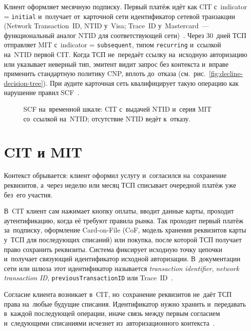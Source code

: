 Клиент оформляет месячную подписку. Первый платёж идёт как CIT с~indicator =
\texttt{initial} и~получает от~карточной сети идентификатор сетевой транзакции
(Network Transaction~ID, NTID у~Visa; Trace~ID у~Mastercard~--- функциональный
аналог NTID для соответствующей сети)~\cite{mrc-nti-trace-id}. Через 30~дней
ТСП отправляет MIT с~indicator = \texttt{subsequent}, типом \texttt{recurring}
и~ссылкой на~NTID первой CIT. Когда ТСП не~передаёт ссылку на~исходную
авторизацию или указывает неверный тип, эмитент видит запрос без контекста
и~вправе применить стандартную политику CNP, вплоть до~отказа
(см.~рис.~\ref{fig:decline-decision-tree}). При аудите карточная сеть
квалифицирует такую операцию как нарушение правил
SCF~\cite{mc-tpr,visa-core-rules}.

\begin{figure}[htbp]
  \centering
  \caption{SCF на~временной шкале: CIT с~выдачей NTID и~серия MIT
  со~ссылкой на~NTID; отсутствие NTID ведёт к~отказу.}\label{fig:scf-lifecycle}
\end{figure}
\FloatBarrier

\section{CIT и MIT}\label{sec:subscriptions-cit-mit}

Контекст обрывается: клиент оформил услугу и~согласился
на~сохранение реквизитов, а~через неделю или месяц ТСП списывает очередной
платёж уже без~его участия.

В~CIT клиент сам нажимает кнопку оплаты, вводит данные карты, проходит
аутентификацию, когда её требуют правила рынка. Так проходит первый платёж
за~подписку, оформление Card-on-File (CoF, модель хранения реквизитов карты
у~ТСП для последующих списаний) или покупка, после которой ТСП получает право
сохранить реквизиты. Система фиксирует исходную точку цепочки и~получает
связующий идентификатор исходной авторизации. В~документации сети или шлюза
этот идентификатор называется \textit{transaction identifier}, \textit{network transaction ID},
\texttt{previousTransactionID} или
Trace~ID~\cite{mc-tpr,cybs-initial-transactions,cybs-mc-subscription-mit}.

Согласие клиента возникает в~CIT, но~сохранение реквизитов не~даёт ТСП права
на~любые будущие списания. Идентификатор нужно хранить и~передавать в~каждой
последующей операции, иначе связь между первым согласием и~следующими
списаниями исчезнет из~авторизационного
контекста~\cite{mc-tpr,cybs-initial-transactions}.

